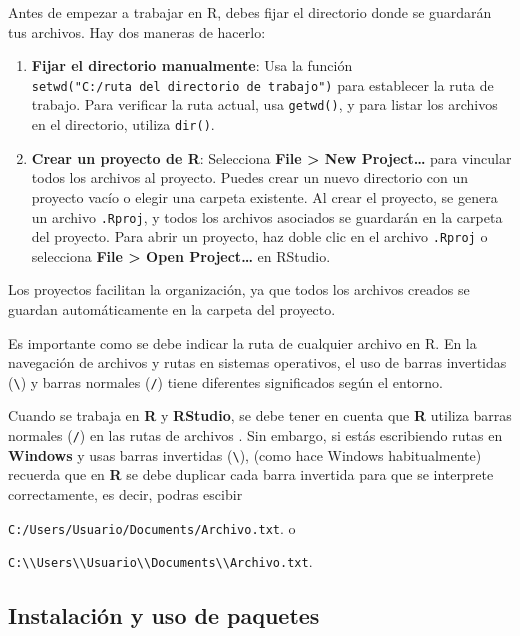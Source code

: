 \documentclass[
  letterpaper,
]{scrbook}
\begin{document}
Antes de empezar a trabajar en R, debes fijar el directorio donde se
guardarán tus archivos. Hay dos maneras de hacerlo:

\begin{enumerate}
\def\labelenumi{\arabic{enumi}.}
\item
  \textbf{Fijar el directorio manualmente}: Usa la función
  \texttt{setwd("C:/ruta\ del\ directorio\ de\ trabajo")} para
  establecer la ruta de trabajo. Para verificar la ruta actual, usa
  \texttt{getwd()}, y para listar los archivos en el directorio, utiliza
  \texttt{dir()}.
\item
  \textbf{Crear un proyecto de R}: Selecciona \textbf{File
  \textgreater{} New Project\ldots{}} para vincular todos los archivos
  al proyecto. Puedes crear un nuevo directorio con un proyecto vacío o
  elegir una carpeta existente. Al crear el proyecto, se genera un
  archivo \texttt{.Rproj}, y todos los archivos asociados se guardarán
  en la carpeta del proyecto. Para abrir un proyecto, haz doble clic en
  el archivo \texttt{.Rproj} o selecciona \textbf{File \textgreater{}
  Open Project\ldots{}} en RStudio.
\end{enumerate}

Los proyectos facilitan la organización, ya que todos los archivos
creados se guardan automáticamente en la carpeta del proyecto.

Es importante como se debe indicar la ruta de cualquier archivo en R. En
la navegación de archivos y rutas en sistemas operativos, el uso de
barras invertidas (\texttt{\textbackslash{}}) y barras normales
(\texttt{/}) tiene diferentes significados según el entorno.

Cuando se trabaja en \textbf{R} y \textbf{RStudio}, se debe tener en
cuenta que \textbf{R} utiliza barras normales (\texttt{/}) en las rutas
de archivos . Sin embargo, si estás escribiendo rutas en
\textbf{Windows} y usas barras invertidas (\texttt{\textbackslash{}}),
(como hace Windows habitualmente) recuerda que en \textbf{R} se debe
duplicar cada barra invertida para que se interprete correctamente, es
decir, podras escibir

\texttt{C:/Users/Usuario/Documents/Archivo.txt}. o

\texttt{C:\textbackslash{}\textbackslash{}Users\textbackslash{}\textbackslash{}Usuario\textbackslash{}\textbackslash{}Documents\textbackslash{}\textbackslash{}Archivo.txt}.

\hypertarget{instalaciuxf3n-y-uso-de-paquetes}{%
\subsection{Instalación y uso de
paquetes}\label{instalaciuxf3n-y-uso-de-paquetes}}
\end{document}
